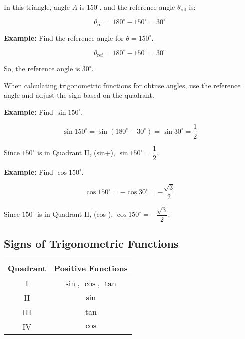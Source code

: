 \documentclass{article}
\begin{document}
\begin{multicols}{2}
\begin{center}
\end{center}

In this triangle, angle \( A \) is \(150^\circ\), and the reference angle \( \theta_{\text{ref}} \) is:

\[
\theta_{\text{ref}} = 180^\circ - 150^\circ = 30^\circ
\]


\textbf{Example:}  Find the reference angle for \( \theta = 150^\circ \).

\[
\theta_{\text{ref}} = 180^\circ - 150^\circ = 30^\circ
\]

So, the reference angle is \(30^\circ\).

When calculating trigonometric functions for obtuse angles, use the reference angle and adjust the sign based on the quadrant.


\textbf{Example:}  Find \(\sin 150^\circ\).

\[
\sin 150^\circ = \sin (180^\circ - 30^\circ) = \sin 30^\circ = \dfrac{1}{2}
\]

Since \(150^\circ\) is in Quadrant II, (sin+), \(\sin 150^\circ = \dfrac{1}{2}\).

\textbf{Example:}  Find \(\cos 150^\circ\).

\[
\cos 150^\circ = -\cos 30^\circ = -\dfrac{\sqrt{3}}{2}
\]

Since \(150^\circ\) is in Quadrant II, (cos-), \(\cos 150^\circ = -\dfrac{\sqrt{3}}{2}\).

\subsection*{Signs of Trigonometric Functions}
\begin{center}
\begin{tabular}{|c|c|}
\hline
Quadrant & Positive Functions \\
\hline
I & \(\sin\), \(\cos\), \(\tan\) \\
II & \(\sin\) \\
III & \(\tan\) \\
IV & \(\cos\) \\
\hline
\end{tabular}
\end{center}


\end{multicols}
\end{document}
